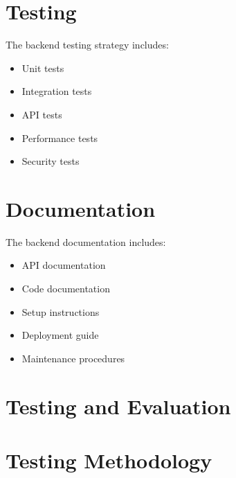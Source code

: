 \section{Testing}
The backend testing strategy includes:
\begin{itemize}
    \item Unit tests
    \item Integration tests
    \item API tests
    \item Performance tests
    \item Security tests
\end{itemize}

\section{Documentation}
The backend documentation includes:
\begin{itemize}
    \item API documentation
    \item Code documentation
    \item Setup instructions
    \item Deployment guide
    \item Maintenance procedures
\end{itemize}

\section{Testing and Evaluation}
\label{chap:testing}

\section{Testing Methodology}

